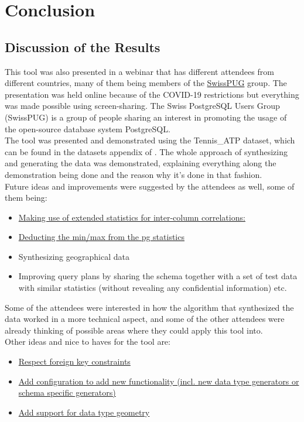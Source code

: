\chapter{Conclusion}
\section{Discussion of the Results}
This tool was also presented in a webinar that has different attendees from different countries, many of them being members of the \href{https://www.swisspug.org/wiki/index.php/Swiss_PostgreSQL_Users_Group}{SwissPUG} group. The presentation was held online because of the COVID-19 restrictions but everything was made possible using screen-sharing.
The Swiss PostgreSQL Users Group (SwissPUG) is a group of people sharing an interest in promoting the usage of the open-source database system PostgreSQL. \cite{SwissPUGWiki} \\
\newline
The tool was presented and demonstrated using the Tennis\_ATP dataset, which can be found in the datasets appendix of . The whole approach of synthesizing and generating the data was demonstrated, explaining everything along the demonstration being done and the reason why it's done in that fashion.\\
\newline
Future ideas and improvements were suggested by the attendees as well, some of them being:
\begin{itemize}
\item{\href{https://gitlab.com/labiangashi/pgsynthdata/-/issues/7}{Making use of extended statistics for inter-column correlations:}}
\item{\href{https://gitlab.com/labiangashi/pgsynthdata/-/issues/8}{Deducting the min/max from the pg statistics}}
\item{Synthesizing geographical data}
\item{Improving query plans by sharing the schema together with a set of test data with similar statistics (without revealing any confidential information) etc.}
\end{itemize}
Some of the attendees were interested in how the algorithm that synthesized the data worked in a more technical aspect, and some of the other attendees were already thinking of possible areas where they could apply this tool into.\\
\newline
Other ideas and nice to haves for the tool are:
\begin{itemize}
\item{\href{https://gitlab.com/labiangashi/pgsynthdata/-/issues/4}{Respect foreign key constraints}}
\item{\href{https://gitlab.com/labiangashi/pgsynthdata/-/issues/5}{Add configuration to add new functionality (incl. new data type generators or schema specific generators)}}
\item{\href{https://gitlab.com/labiangashi/pgsynthdata/-/issues/6}{Add support for data type geometry}}
\end{itemize}
